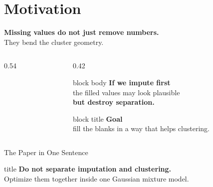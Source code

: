 \section{Motivation}

\begin{frame}[plain,shrink=6]
    \vspace{0.2cm}
    {\Huge \textbf{Missing values do not just remove numbers.}}\\[0.25cm]
    {\LARGE \textcolor{techBlue}{They bend the cluster geometry.}}

    \vspace{0.35cm}
    \begin{columns}[T,onlytextwidth]
        \begin{column}{0.54\textwidth}
            
        \end{column}
        \begin{column}{0.42\textwidth}
            \vspace{0.1cm}
            \begin{beamercolorbox}[sep=0.8em, rounded=true, shadow=true]{block body}
                \large
                \textbf{If we impute first}\\
                \normalsize the filled values may look plausible\\
                \textbf{but destroy separation.}
            \end{beamercolorbox}

            \vspace{0.2cm}
            \begin{beamercolorbox}[sep=0.8em, rounded=true, shadow=true]{block title}
                \large
                \textbf{Goal}\\
                \normalsize fill the blanks in a way that helps clustering.
            \end{beamercolorbox}
        \end{column}
    \end{columns}
\end{frame}


\begin{frame}[shrink=4]{The Paper in One Sentence}
    \begin{center}
        \begin{beamercolorbox}[sep=0.95em, rounded=true, shadow=true, wd=0.92\textwidth, center]{title}
            \large
            \textbf{Do not separate imputation and clustering.}\\[0.4em]
            \normalsize
            Optimize them \textcolor{alertRed}{together} inside one Gaussian mixture model.
        \end{beamercolorbox}
    \end{center}

    \vspace{0.2cm}
    
\end{frame}
